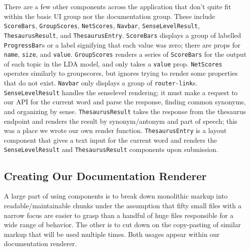 \documentclass[11pt, twoside, reqno]{book}
\begin{document}
There are a few other components across the application that don't quite fit within the basic UI group nor the documentation group. These include \texttt{ScoreBars}, \texttt{GroupScores}, \texttt{NetScores}, \texttt{Navbar}, \texttt{SenseLevelResult}, \texttt{ThesaurusResult}, and \texttt{ThesaurusEntry}. \texttt{ScoreBars} displays a group of labelled \texttt{ProgressBar}s or a label signifying that each value was zero; there are props for \texttt{name}, \texttt{size}, and \texttt{value}. \texttt{GroupScores} renders a series of \texttt{ScoreBars} for the output of each topic in the LDA model, and only takes a \texttt{value} prop. \texttt{NetScores} operates similarly to groupscores, but ignores trying to render some properties that do not exist. \texttt{Navbar} only displays a group of \texttt{router-link}s. \texttt{SenseLevelResult} handles the senselevel rendering; it must make a request to our API for the current word and parse the response, finding common synonyms, and organizing by sense. \texttt{ThesaurusResult} takes the response from the thesaurus endpoint and renders the result by synonym/antonym and part of speech; this was a place we wrote our own render function. \texttt{ThesaurusEntry} is a layout component that gives a text input for the current word and renders the \texttt{SenseLevelResult} and \texttt{ThesaurusResult} components upon submission.

\subsection{Creating Our Documentation Renderer}

A large part of using components is to break down monolithic markup into readable/maintainable chunks under the assumption that fifty small files with a narrow focus are easier to grasp than a handful of huge files responsible for a wide range of behavior. The other is to cut down on the copy-pasting of similar markup that will be used multiple times. Both usages appear within our documentation renderer.
\end{document}
